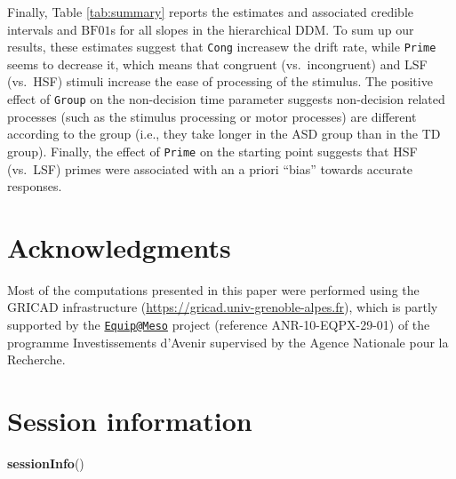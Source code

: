 \documentclass[
  11pt,
  english,
  ,doc,floatsintext]{apa6}
\newenvironment{Shaded}{}{}
\newcommand{\KeywordTok}[1]{\textcolor[rgb]{0.00,0.44,0.13}{\textbf{#1}}}
\newcommand{\NormalTok}[1]{#1}
\begin{document}
Finally, Table \ref{tab:summary} reports the estimates and associated credible intervals and \(\text{BF01}\)s for all slopes in the hierarchical DDM. To sum up our results, these estimates suggest that \texttt{Cong} increasew the drift rate, while \texttt{Prime} seems to decrease it, which means that congruent (vs.~incongruent) and LSF (vs.~HSF) stimuli increase the ease of processing of the stimulus. The positive effect of \texttt{Group} on the non-decision time parameter suggests non-decision related processes (such as the stimulus processing or motor processes) are different according to the group (i.e., they take longer in the ASD group than in the TD group). Finally, the effect of \texttt{Prime} on the starting point suggests that HSF (vs.~LSF) primes were associated with an a priori \enquote{bias} towards accurate responses.

\hypertarget{acknowledgments}{%
\section{Acknowledgments}\label{acknowledgments}}

Most of the computations presented in this paper were performed using the GRICAD infrastructure (\url{https://gricad.univ-grenoble-alpes.fr}), which is partly supported by the \href{mailto:Equip@Meso}{\nolinkurl{Equip@Meso}} project (reference ANR-10-EQPX-29-01) of the programme Investissements d'Avenir supervised by the Agence Nationale pour la Recherche.

\newpage

\hypertarget{session-information}{%
\section{Session information}\label{session-information}}

\begin{Shaded}
\begin{Highlighting}[]
\KeywordTok{sessionInfo}\NormalTok{()}
\end{Highlighting}
\end{Shaded}
\end{document}
